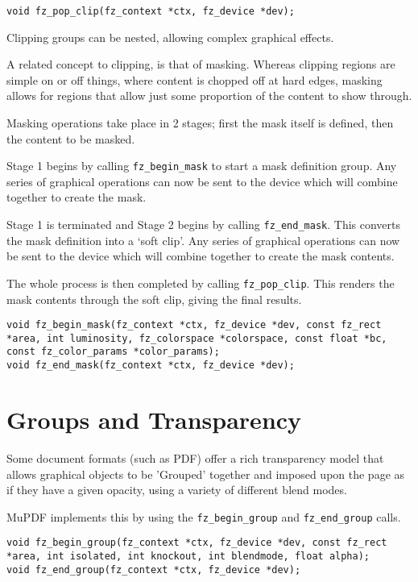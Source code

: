 \documentclass[oneside]{book}
\begin{document}
\begin{lstlisting}
void fz_pop_clip(fz_context *ctx, fz_device *dev);
\end{lstlisting}

Clipping groups can be nested, allowing complex graphical effects.

A related concept to clipping, is that of masking. Whereas clipping regions are simple on or off things, where content is chopped off at hard edges, masking allows for regions that allow just some proportion of the content to show through. 

Masking operations take place in 2 stages; first the mask itself is defined, then the content to be masked.

Stage 1 begins by calling \texttt{fz\_begin\_mask} to start a mask definition group. Any series of graphical operations can now be sent to the device which will combine together to create the mask.

Stage 1 is terminated and Stage 2 begins by calling \texttt{fz\_end\_mask}. This converts the mask definition into a `soft clip'. Any series of graphical operations can now be sent to the device which will combine together to create the mask contents.

The whole process is then completed by calling \texttt{fz\_pop\_clip}. This renders the mask contents through the soft clip, giving the final results.

\begin{lstlisting}
void fz_begin_mask(fz_context *ctx, fz_device *dev, const fz_rect *area, int luminosity, fz_colorspace *colorspace, const float *bc, const fz_color_params *color_params);
void fz_end_mask(fz_context *ctx, fz_device *dev);
\end{lstlisting}

\section{Groups and Transparency}

Some document formats (such as PDF) offer a rich transparency model that allows graphical objects to be 'Grouped' together and imposed upon the page as if they have a given opacity, using a variety of different blend modes.

MuPDF implements this by using the \texttt{fz\_begin\_group} and \texttt{fz\_end\_group} calls.

\begin{lstlisting}
void fz_begin_group(fz_context *ctx, fz_device *dev, const fz_rect *area, int isolated, int knockout, int blendmode, float alpha);
void fz_end_group(fz_context *ctx, fz_device *dev);
\end{lstlisting}
\end{document}
